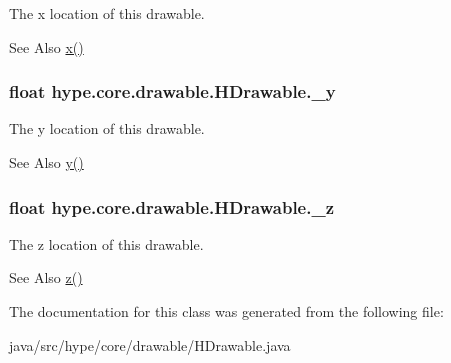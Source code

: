 The x location of this drawable. 

\begin{DoxySeeAlso}{See Also}
\hyperlink{classhype_1_1core_1_1drawable_1_1_h_drawable_a16a4a0d69a27ed1604739b9bfa9aac10}{x()} 
\end{DoxySeeAlso}
\hypertarget{classhype_1_1core_1_1drawable_1_1_h_drawable_a449159180f9b00f522d9f70226c31302}{
\subsubsection[{\-\_\-y}]{\setlength{\rightskip}{0pt plus 5cm}float hype.\-core.\-drawable.\-H\-Drawable.\-\_\-y\hspace{0.3cm}{\ttfamily [protected]}}}\label{classhype_1_1core_1_1drawable_1_1_h_drawable_a449159180f9b00f522d9f70226c31302}


The y location of this drawable. 

\begin{DoxySeeAlso}{See Also}
\hyperlink{classhype_1_1core_1_1drawable_1_1_h_drawable_a098090f981054ce26bbd4c9e23b0c47f}{y()} 
\end{DoxySeeAlso}
\hypertarget{classhype_1_1core_1_1drawable_1_1_h_drawable_ad66aec98221c2988eda1ffb4310ca72a}{
\subsubsection[{\-\_\-z}]{\setlength{\rightskip}{0pt plus 5cm}float hype.\-core.\-drawable.\-H\-Drawable.\-\_\-z\hspace{0.3cm}{\ttfamily [protected]}}}\label{classhype_1_1core_1_1drawable_1_1_h_drawable_ad66aec98221c2988eda1ffb4310ca72a}


The z location of this drawable. 

\begin{DoxySeeAlso}{See Also}
\hyperlink{classhype_1_1core_1_1drawable_1_1_h_drawable_abfe7cfead38fee117b343971def82916}{z()} 
\end{DoxySeeAlso}


The documentation for this class was generated from the following file\-:\begin{DoxyCompactItemize}
\item 
java/src/hype/core/drawable/H\-Drawable.\-java\end{DoxyCompactItemize}
